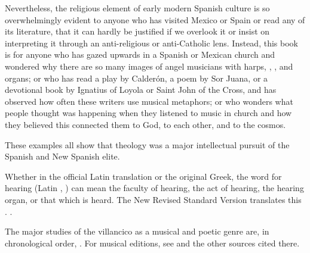 Nevertheless, the religious element of early modern Spanish culture is so
overwhelmingly evident to anyone who has visited Mexico or Spain or read any of
its literature, that it can hardly be justified if we overlook it or insist on
interpreting it through an anti-religious or anti-Catholic lens.
Instead, this book is for anyone who has gazed upwards in a Spanish or Mexican
church and wondered why there are so many images of angel musicians with harps,
, , and organs; or who has read a play by
Calderón, a poem by Sor Juana, or a devotional book by Ignatius of Loyola or
Saint John of the Cross, and has observed how often these writers use musical
metaphors; or who wonders what people thought was happening when they listened
to music in church and how they believed this connected them to God, to each
other, and to the cosmos.

These examples all show that theology was a major intellectual pursuit of the
Spanish and New Spanish elite.

\begin{Footnote}
    Whether in the official Latin translation or the original Greek, the word for
    hearing (Latin , \Greek {}) can mean the faculty of
    hearing, the act of hearing, the hearing organ, or that which is heard.
    The New Revised Standard Version translates this .
    \Autocites{Weber:Vulgate}{Aland:GNT4}[]{BDAG}.
\end{Footnote}



\begin{Footnote}
    The major studies of the villancico as a musical and poetic genre are, in
    chronological order,
    \autocites{Rubio:Forma}{Laird:VC}{Torrente:PhD}{Tenorio:SorJuana}
    {CaberoPueyo:PhD}{Illari:Polychoral}{Knighton-Torrente:VCs}
    {Davies:Guadalupe}
    {Cashner:Cards}{Cashner:PhD}
    {LopezLorenzo:VC-Sevillano}{Swadley:VillancicoPhD}{Torrente:Historia17C}
    {ChavezBarcenas:PhD}.
    For musical editions, see \autocite{Cashner:WLSCM32} and the other sources
    cited there.
\end{Footnote}


